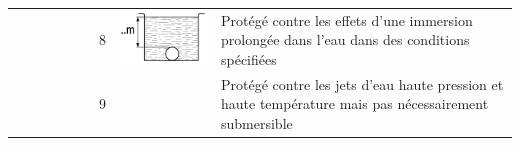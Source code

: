 \begin{xltabular}{\linewidth}{p{0.3cm} m{2cm} X p{0.3cm} m{2cm} X p{0.3cm} m{2.2cm} X}
		&  & 	& 	& & & 8 & 	\includegraphics[scale=1.1]{X8.png}	&	Protégé contre les effets d'une immersion prolongée dans l'eau dans des conditions spécifiées \\
		&  & 	& 	& & & 9 & 	&	Protégé contre les jets d'eau haute pression et haute température mais pas nécessairement submersible \\
\end{xltabular}	


%

